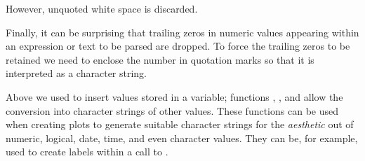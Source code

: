 \documentclass[krantz2]{krantz}\usepackage{knitr}
\begin{document}
\begin{explainbox}
\begin{knitrout}\footnotesize
{}\color{fgcolor}\begin{kframe}
\begin{alltt}
  \hlstd{(}\hlstd{(} \hlstd{=} \hlstd{))}
\end{alltt}
\end{kframe}
\end{knitrout}

However, unquoted white space is discarded.

\begin{knitrout}\footnotesize
{}\color{fgcolor}\begin{kframe}
\begin{alltt}
  \hlstd{(}\hlstd{(} \hlstd{=} \hlstd{))}
\end{alltt}
\end{kframe}
\end{knitrout}

Finally, it can be surprising that trailing zeros in numeric values appearing within an expression or text to be parsed are dropped. To force the trailing zeros to be retained we need to enclose the number in quotation marks so that it is interpreted as a character string.

\begin{knitrout}\footnotesize
{}\color{fgcolor}\begin{kframe}
\begin{alltt}
  \hlopt{+}
  \hlstd{()} \hlopt{+}
  \hlstd{(} \hlstd{=} \hlstd{,}
            \hlstd{=} \hlstd{(}\hlstd{,} \hlstd{),}  \hlstd{=} \hlstd{(}\hlstd{,} \hlstd{,} \hlstd{),}
            \hlstd{=} \hlstd{(}\hlstd{,} \hlstd{,} \hlstd{),}  \hlstd{=} \hlstd{)}
\end{alltt}
\end{kframe}
\end{knitrout}
\end{explainbox}

Above we used  to insert values stored in a variable; functions , , and  allow the conversion into character strings of other values. These functions can be used when creating plots to generate suitable character strings for the  \emph{aesthetic} out of numeric, logical, date, time, and even character values. They can be, for example, used to create labels within a call to .
\end{document}
